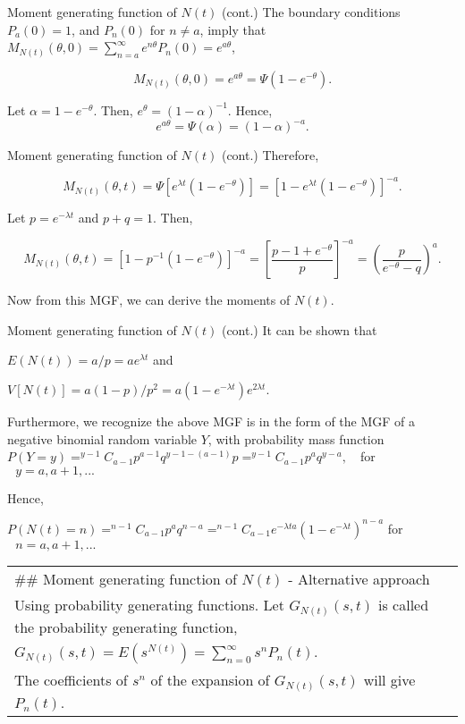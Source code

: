 \documentclass[12pt,ignorenonframetext,]{beamer}
\begin{document}
\begin{frame}{Moment generating function of \(N(t)\) (cont.)}
\protect\hypertarget{moment-generating-function-of-nt-cont.-7}{}
The boundary conditions \(P_a(0)=1\), and \(P_n(0)\) for \(n \neq a\),
imply that
\(M_{N(t)}(\theta, 0) = \sum_{n=a}^{\infty} e^{n \theta}P_n(0)=e^{a\theta}\),

\[M_{N(t)}(\theta, 0)= e^{a \theta} = \Psi(1-e^{-\theta}).\]

Let \(\alpha=1-e^{-\theta}\). Then, \(e^{\theta}=(1-\alpha)^{-1}.\)
Hence, \[e^{a\theta} = \Psi(\alpha) = (1-\alpha)^{-a}.\]
\end{frame}

\begin{frame}{Moment generating function of \(N(t)\) (cont.)}
\protect\hypertarget{moment-generating-function-of-nt-cont.-8}{}
Therefore,

\[M_{N(t)}(\theta, t) = \Psi [e^{\lambda t}(1-e^{-\theta})] = [1-e^{\lambda t}(1-e^{-\theta})]^{-a}.\]

Let \(p = e^{-\lambda t}\) and \(p+q=1\). Then,

\[M_{N(t)}(\theta, t) =  [1-p^{-1}(1-e^{-\theta})]^{-a} = \left[ \frac{p-1+e^{-\theta}}{p}\right]^{-a} = \left(\frac{p}{e^{-\theta}-q}\right)^a.\]

Now from this MGF, we can derive the moments of \(N(t)\).
\end{frame}

\begin{frame}{Moment generating function of \(N(t)\) (cont.)}
\protect\hypertarget{moment-generating-function-of-nt-cont.-9}{}
It can be shown that

\(E(N(t)) = a/p = ae^{\lambda t}\) and

\(V[N(t)] = a(1-p)/p^2= a(1-e^{-\lambda t})e^{2\lambda t}.\)

Furthermore, we recognize the above MGF is in the form of the MGF of a
negative binomial random variable \(Y\), with probability mass function
\(P(Y=y) = ^{y-1}C_{a-1}p^{a-1}q^{y-1-(a-1)}p = ^{y-1}C_{a-1}p^aq^{y-a}, \text { }\)
for \(\text{   } y = a, a+1, ...\)

Hence,

\(P(N(t)=n) = ^{n-1}C_{a-1}p^{a}q^{n-a} = ^{n-1}C_{a-1}e^{-\lambda t a}(1-e^{-\lambda t})^{n-a}\)
for \(\text{   } n = a, a+1, ...\)

\begin{longtable}[]{@{}
  >{\raggedright\arraybackslash}p{}@{}}
\toprule
\endhead
\#\# Moment generating function of \(N(t)\) - Alternative approach \\
Using probability generating functions. Let \(G_{N(t)}(s, t)\) is called
the probability generating function, \\
\(G_{N(t)}(s, t) = E(s^{N(t)}) = \sum_{n=0}^{\infty}s^nP_n(t).\) \\
The coefficients of \(s^n\) of the expansion of \(G_{N(t)}(s, t)\) will
give \(P_n(t)\). \\
\bottomrule
\end{longtable}
\end{frame}
\end{document}
